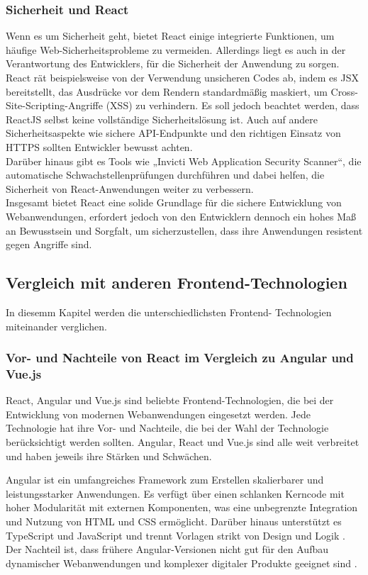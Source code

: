 \subsubsection{Sicherheit und React}
Wenn es um Sicherheit geht, bietet React einige integrierte Funktionen, um häufige Web-Sicherheitsprobleme zu vermeiden. Allerdings liegt es  auch in der Verantwortung des Entwicklers, für die Sicherheit der Anwendung zu sorgen.\\
React rät beispielsweise von der Verwendung unsicheren Codes ab, indem es JSX bereitstellt, das  Ausdrücke vor dem Rendern standardmäßig maskiert, um Cross-Site-Scripting-Angriffe (XSS)  zu verhindern. Es soll jedoch beachtet werden, dass ReactJS selbst keine vollständige Sicherheitslösung ist. Auch auf andere Sicherheitsaspekte wie sichere API-Endpunkte und den richtigen Einsatz von HTTPS sollten Entwickler bewusst achten.\\
Darüber hinaus gibt es Tools wie „Invicti Web Application Security Scanner“, die  automatische Schwachstellenprüfungen durchführen und dabei helfen, die Sicherheit von React-Anwendungen weiter zu verbessern\cite{geekflare_learning_resources}\cite{geekflare_rendering}.\\
Insgesamt bietet React  eine solide Grundlage für die sichere Entwicklung von Webanwendungen,  erfordert jedoch von den Entwicklern dennoch ein hohes Maß an Bewusstsein und Sorgfalt, um sicherzustellen, dass ihre Anwendungen resistent gegen Angriffe sind.\\
\newpage
\subsection{Vergleich mit anderen Frontend-Technologien}
In diesemm Kapitel werden die unterschiedlichsten Frontend- Technologien miteinander verglichen.
\subsubsection{Vor- und Nachteile von React im Vergleich zu Angular und Vue.js}
React, Angular und Vue.js sind beliebte Frontend-Technologien, die bei der Entwicklung von modernen Webanwendungen eingesetzt werden. Jede Technologie hat ihre Vor- und Nachteile, die bei der Wahl der Technologie berücksichtigt werden sollten.
Angular, React und Vue.js sind alle weit verbreitet und haben jeweils ihre Stärken und Schwächen.\newline

Angular ist ein umfangreiches Framework zum Erstellen skalierbarer und leistungsstarker Anwendungen. Es verfügt über einen schlanken Kerncode mit hoher Modularität mit externen Komponenten, was eine unbegrenzte Integration und Nutzung von HTML und CSS ermöglicht. Darüber hinaus unterstützt es TypeScript und JavaScript und trennt Vorlagen strikt  von Design und Logik \cite{hosttest2021}. Der Nachteil ist, dass frühere Angular-Versionen nicht gut für den Aufbau dynamischer Webanwendungen und  komplexer digitaler Produkte  geeignet sind \cite{ichi2023}.\newline

